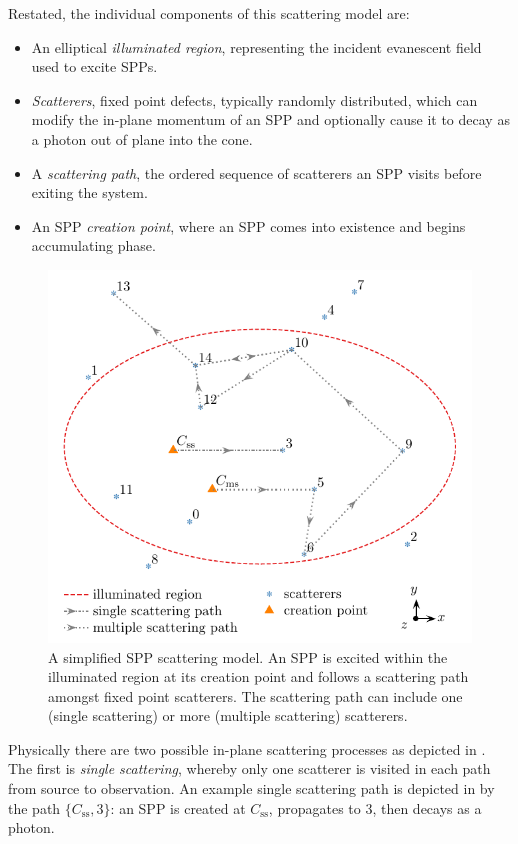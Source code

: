 Restated, the individual components of this scattering model are:
\begin{itemize}
\item An elliptical \textit{illuminated region}, representing the incident
				evanescent field used to excite SPPs.
\item \textit{Scatterers}, fixed point defects, typically randomly
				distributed, which can modify the in-plane momentum of an SPP and
				optionally cause it to decay as a photon out of plane into the cone. 
\item A \textit{scattering path}, the ordered sequence of
				scatterers an SPP visits before exiting the system.  
\item An SPP \textit{creation point}, where an SPP comes into existence and
				begins accumulating phase.
\end{itemize}
\begin{figure}[ht]
\centering
\includegraphics[keepaspectratio]{scatteringmicro/figures/montecarlogeosimple.pdf}
\caption{A simplified SPP scattering model.  An SPP is excited within the
				illuminated region at its creation point and follows a scattering path
				amongst fixed point scatterers.  The scattering path can include one
				(single scattering) or more (multiple scattering) scatterers.
}
\label{fig:plasmongeosimple}
\end{figure}

Physically there are two possible in-plane scattering processes as depicted in
.  The first is \textit{single scattering},
whereby only one scatterer is visited in each path from source to
observation.  An example single scattering path is depicted in
 by the path $\{C_\mathrm{ss},3\}$: an SPP is
created at $C_\mathrm{ss}$, propagates to $3$, then decays as a photon.

